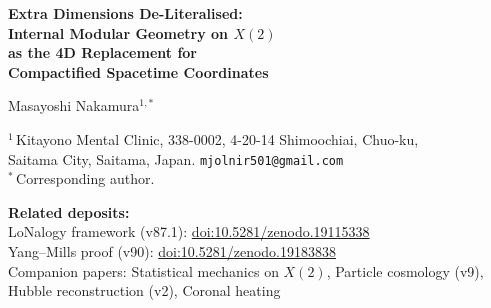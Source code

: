 \documentclass[12pt]{article}
\theoremstyle{plain}
\theoremstyle{definition}
\numberwithin{equation}{section}
\newcommand{\br}{\mathrm{br}}
\begin{document}
\begin{titlepage}
\centering
\vspace*{1cm}

{\LARGE\bfseries Extra Dimensions De-Literalised:\\[6pt]
Internal Modular Geometry on $X(2)$\\[6pt]
as the 4D Replacement for\\[6pt]
Compactified Spacetime Coordinates}

\vspace{1.5cm}

{\large Masayoshi Nakamura$^{1,*}$}

\vspace{0.8cm}

{\normalsize
$^1$\,Kitayono Mental Clinic,
338-0002, 4-20-14 Shimoochiai, Chuo-ku,\\
Saitama City, Saitama, Japan.
\texttt{mjolnir501@gmail.com}\\[4pt]
$^*$\,Corresponding author.
}

\vspace{0.8cm}

{\small
\noindent\textbf{Related deposits:}\\
LoNalogy framework (v87.1):
\href{https://doi.org/10.5281/zenodo.19115338}{doi:10.5281/zenodo.19115338}\\
Yang--Mills proof (v90):
\href{https://doi.org/10.5281/zenodo.19183838}{doi:10.5281/zenodo.19183838}\\
Companion papers: Statistical mechanics on $X(2)$,
Particle cosmology (v9), Hubble reconstruction (v2),
Coronal heating
}

\vspace{1.0cm}

\begin{abstract}
\noindent
String theory requires extra spatial dimensions for quantum-gravitational
consistency.  Despite extensive searches at the LHC
($M_D\gtrsim 5.5$--$11.2\,\mathrm{TeV}$ for ADD graviton emission,
$m_1\gtrsim 2.2$--$5.6\,\mathrm{TeV}$ for RS Kaluza--Klein gravitons)
and in short-distance gravity experiments ($R<44\,\mu\mathrm{m}$ for
$\delta=1$), no evidence for extra dimensions has been found.

We show that in the LoNalogy framework, literal extra spacetime
coordinates are unnecessary.  The core action is 4-dimensional;
the roles played by extra dimensions in string theory---gauge
unification, family structure, coupling hierarchy---are assumed by
the internal modular/fiber geometry of $X(2)$: the rank-5 bundle,
three-cusp family, and bridge/hidden sectors.  The integers
$\nu_{\br}=12$, $d_{\mathrm{fib}}=7$, $N=5$ that appear in
LoNalogy are internal bundle dimensions, not spacetime coordinates.

The conclusion is that extra dimensions are not denied but
\emph{de-literalised}: they are reinterpreted as internal
geometry of a 4D law, consistent with the mainstream AdS/CFT
reading of warped extra dimensions as 4D composite dynamics.
\end{abstract}
\end{titlepage}
\end{document}
